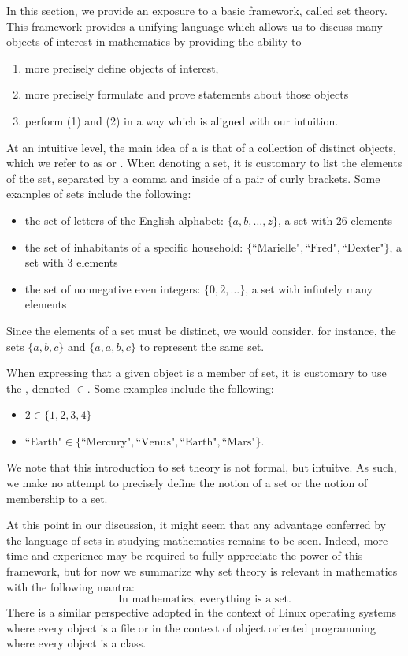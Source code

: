 \documentclass{book}
\begin{document}
	In this section, we provide an exposure to a basic framework, called set theory. This framework provides a unifying language which allows us to discuss many objects of interest in mathematics by providing the ability to 
	\begin{enumerate}
		\item more precisely define objects of interest, 
		\item more precisely formulate and prove statements about those objects
		\item perform (1) and (2) in a way which is aligned with our intuition.
	\end{enumerate}
	At an intuitive level, the main idea of a  is that of a collection of distinct objects, which we refer to as  or . When denoting a set, it is customary to list the elements of the set, separated by a comma and inside of a pair of curly brackets. Some examples of sets include the following:
	\begin{itemize}
		\item the set of letters of the English alphabet: $\{a, b, \ldots, z\}$, a set with 26 elements
		\item the set of inhabitants of a specific household: $\{\text{``Marielle"}, \text{``Fred"}, \text{``Dexter"}\}$, a set with 3 elements
		\item the set of nonnegative even integers: $\{0, 2, \ldots \}$, a set with infintely many elements
	\end{itemize}
	\begin{note}
		Since the elements of a set must be distinct, we would consider, for instance, the sets $\{a, b, c\}$ and $\{a, a, b, c\}$ to represent the same set. 
	\end{note}
	When expressing that a given object is a member of set, it is customary to use the , denoted $\in$. Some examples include the following:
	\begin{itemize}
		\item $2 \in \{1, 2, 3, 4\}$
		\item $\text{``Earth"} \in \{\text{``Mercury"}, \text{``Venus"}, \text{``Earth"}, \text{``Mars"}\}$.
	\end{itemize}
	\begin{note}
		We note that this introduction to set theory is not formal, but intuitve. As such, we make no attempt to precisely define the notion of a set or the notion of membership to a set. 
	\end{note}
	At this point in our discussion, it might seem that any advantage conferred by the language of sets in studying mathematics remains to be seen. Indeed, more time and experience may be required to fully appreciate the power of this framework, but for now we summarize why set theory is relevant in mathematics with the following mantra: 
	$$\text{In mathematics, everything is a set.}$$
	There is a similar perspective adopted in the context of Linux operating systems where every object is a file or in the context of object oriented programming where every object is a class. 
	
\end{document}
